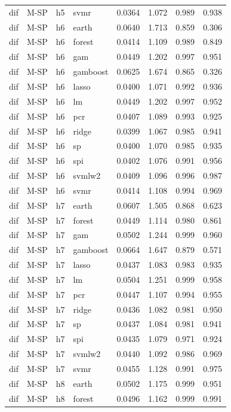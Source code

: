 \begin{ThreePartTable}
\begin{longtable}[t]{llclcccc}
dif & M-SP & h5 & svmr & 0.0364 & 1.072 & 0.989 & 0.938\\
\addlinespace
dif & M-SP & h6 & earth & 0.0640 & 1.713 & 0.859 & 0.306\\
dif & M-SP & h6 & forest & 0.0414 & 1.109 & 0.989 & 0.849\\
dif & M-SP & h6 & gam & 0.0449 & 1.202 & 0.997 & 0.951\\
dif & M-SP & h6 & gamboost & 0.0625 & 1.674 & 0.865 & 0.326\\
dif & M-SP & h6 & lasso & 0.0400 & 1.071 & 0.992 & 0.936\\
dif & M-SP & h6 & lm & 0.0449 & 1.202 & 0.997 & 0.952\\
dif & M-SP & h6 & pcr & 0.0407 & 1.089 & 0.993 & 0.925\\
dif & M-SP & h6 & ridge & 0.0399 & 1.067 & 0.985 & 0.941\\
dif & M-SP & h6 & sp & 0.0400 & 1.070 & 0.985 & 0.935\\
dif & M-SP & h6 & spi & 0.0402 & 1.076 & 0.991 & 0.956\\
dif & M-SP & h6 & svmlw2 & 0.0409 & 1.096 & 0.996 & 0.987\\
dif & M-SP & h6 & svmr & 0.0414 & 1.108 & 0.994 & 0.969\\
\addlinespace
dif & M-SP & h7 & earth & 0.0607 & 1.505 & 0.868 & 0.623\\
dif & M-SP & h7 & forest & 0.0449 & 1.114 & 0.980 & 0.861\\
dif & M-SP & h7 & gam & 0.0502 & 1.244 & 0.999 & 0.960\\
dif & M-SP & h7 & gamboost & 0.0664 & 1.647 & 0.879 & 0.571\\
dif & M-SP & h7 & lasso & 0.0437 & 1.083 & 0.983 & 0.935\\
dif & M-SP & h7 & lm & 0.0504 & 1.251 & 0.999 & 0.958\\
dif & M-SP & h7 & pcr & 0.0447 & 1.107 & 0.994 & 0.955\\
dif & M-SP & h7 & ridge & 0.0436 & 1.082 & 0.981 & 0.950\\
dif & M-SP & h7 & sp & 0.0437 & 1.084 & 0.981 & 0.941\\
dif & M-SP & h7 & spi & 0.0435 & 1.079 & 0.971 & 0.924\\
dif & M-SP & h7 & svmlw2 & 0.0440 & 1.092 & 0.986 & 0.969\\
dif & M-SP & h7 & svmr & 0.0455 & 1.128 & 0.991 & 0.975\\
\addlinespace
dif & M-SP & h8 & earth & 0.0502 & 1.175 & 0.999 & 0.951\\
dif & M-SP & h8 & forest & 0.0496 & 1.162 & 0.999 & 0.991\\

\end{longtable}
\end{ThreePartTable}

